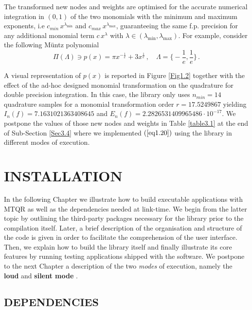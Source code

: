\documentclass[a4paper, twosided]{book}
\begin{document}
\noindent
The transformed new nodes and weights are optimised for the accurate numerical integration in $(0,1)$ of the two monomials with the minimum and maximum exponents, i.e $c_{min}\,x^{\lambda_{\text{min}}}$ and $c_{max}\,x^{\lambda_{\text{max}}}$, guaranteeing the same f.p. precision for any additional monomial term $c\,x^\lambda$ with $\lambda \in (\lambda_{\text{min}},\lambda_{\text{max}})$. For example, consider the following  Müntz polynomial
\begin{equation}\label{eq1.20}
    \Pi(\Lambda)\ni p(x) = \pi x^{-\frac{1}{e}} + 3x^{\frac{1}{e}}\,,\quad\Lambda=\Big\{-\frac{1}{e},\frac{1}{e}\Big\}\,.
\end{equation}

\noindent
A visual representation of $p(x)$ is reported in Figure \ref{Fig1.2} together with the effect of the ad-hoc designed monomial transformation on the quadrature for double precision integration. In this case, the library only uses $n_{min}=14$ quadrature samples for a monomial transformation order $r=17.5249867$ yielding $I_n(f)=7.1631021363408645$ and $E_n(f)=2.2826531409965486\cdot10^{-17}$. We postpone the values of those new nodes and weights in Table \ref{table3.1} at the end of Sub-Section \ref{Sec3.4} where we implemented $(\ref{eq1.20})$ using the library in different modes of execution.

\chapter[Installation]{\Huge \ttfamily INSTALLATION}

In the following Chapter we illustrate how to build executable applications with MTQR as well as the dependencies needed at link-time. We begin from the latter topic by outlining the third-party packages necessary for the library prior to the compilation itself. Later, a brief description of the organisation and structure of the code is given in order to facilitate the comprehension of the user interface. Then, we explain how to build the library itself and finally illustrate its core features by running testing applications shipped with the software. We postpone to the next Chapter a description of the two {\itshape modes} of execution, namely the \color{poliDarkBlue} \textbf{loud} \color{black} and \color{poliDarkBlue} \textbf{silent mode} \color{black}.

\section[Dependencies]{\changefont DEPENDENCIES}\label{Sec2.1}
\end{document}

